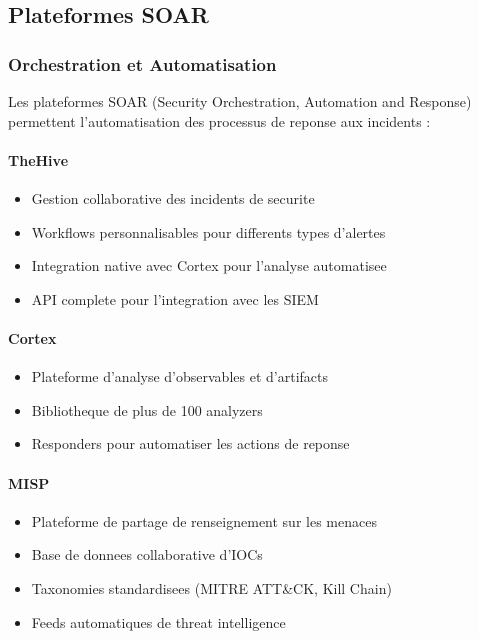 \subsection{Plateformes SOAR}

\subsubsection{Orchestration et Automatisation}

Les plateformes SOAR (Security Orchestration, Automation and Response) permettent l'automatisation des processus de reponse aux incidents :

\paragraph{TheHive}
\begin{itemize}
    \item Gestion collaborative des incidents de securite
    \item Workflows personnalisables pour differents types d'alertes
    \item Integration native avec Cortex pour l'analyse automatisee
    \item API complete pour l'integration avec les SIEM
\end{itemize}

\paragraph{Cortex}
\begin{itemize}
    \item Plateforme d'analyse d'observables et d'artifacts
    \item Bibliotheque de plus de 100 analyzers
    \item Responders pour automatiser les actions de reponse
\end{itemize}

\paragraph{MISP}
\begin{itemize}
    \item Plateforme de partage de renseignement sur les menaces
    \item Base de donnees collaborative d'IOCs
    \item Taxonomies standardisees (MITRE ATT\&CK, Kill Chain)
    \item Feeds automatiques de threat intelligence
\end{itemize}

